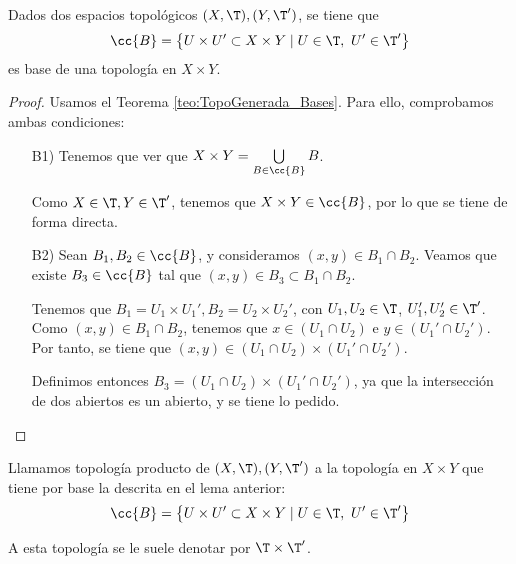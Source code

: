 \begin{lema}
    Dados dos espacios topológicos $(X,\T), (Y,\T')$, se tiene que
    \begin{equation*}
        \cc{B} = \left\{U\times U'\subset X\times Y\mid U\in \T,~U'\in \T'\right\}
    \end{equation*}
    es base de una topología en $X\times Y$.
\end{lema}
\begin{proof}
    Usamos el Teorema \ref{teo:TopoGenerada_Bases}. Para ello, comprobamos ambas condiciones:
    \begin{enumerate}
        \item[B1)] Tenemos que ver que $X\times Y=\bigcup\limits_{B\in \cc{B}}B$.

        Como $X\in \T, Y\in \T'$, tenemos que $X\times Y\in \cc{B}$, por lo que se tiene de forma directa.

        \item[B2)] Sean $B_1,B_2\in \cc{B}$, y consideramos $(x,y)\in B_1\cap B_2$. Veamos que existe $B_3\in \cc{B}$ tal que $(x,y)\in B_3\subset B_1\cap B_2$.

        Tenemos que $B_1=U_1\times U_1', B_2=U_2\times U_2'$, con $U_1,U_2\in \T$, $U_1', U_2'\in \T'$. Como $(x,y)\in B_1\cap B_2$, tenemos que $x\in (U_1\cap U_2)$ e $y\in (U_1'\cap U_2')$. Por tanto, se tiene que $(x,y)\in (U_1\cap U_2)\times (U_1'\cap U_2')$.
        
        Definimos entonces $B_3=(U_1\cap U_2)\times (U_1'\cap U_2')$, ya que la intersección de dos abiertos es un abierto, y se tiene lo pedido.
    \end{enumerate}
\end{proof}

\begin{definicion}
    Llamamos topología producto de $(X,\T), (Y,\T')$ a la topología en $X\times Y$ que tiene por base la descrita en el lema anterior:
    \begin{equation*}
        \cc{B} = \left\{U\times U'\subset X\times Y\mid U\in \T,~U'\in \T'\right\}
    \end{equation*}

    A esta topología se le suele denotar por $\T\times \T'$.
\end{definicion}

